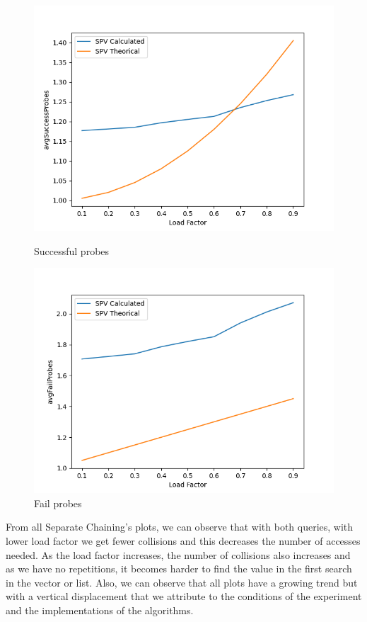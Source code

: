 \documentclass{article}
\begin{document}
        \begin{figure}[!h]
          \includegraphics[width=\linewidth]{images/loadFactor_vs_avgSuccessProbes_SPV.png}
          \caption{Successful probes}\label{fig:plot14}
        \endminipage\hfill
          \includegraphics[width=\linewidth]{images/loadFactor_vs_avgFailProbes_SPV.png}
          \caption{Fail probes}\label{fig:plot15}
        \endminipage
    \end{figure}
    
    From all Separate Chaining's plots, we can observe that with both queries, with lower load factor we get fewer collisions and this decreases the number of accesses needed. As the load factor increases, the number of collisions also increases and as we have no repetitions, it becomes harder to find the value in the first search in the vector or list. Also, we can observe that all plots have a growing trend but with a vertical displacement that we attribute to the conditions of the experiment and the implementations of the algorithms.
    
\end{document}
